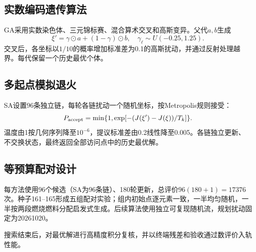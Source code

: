 \subsection{实数编码遗传算法}
GA采用实数染色体、三元锦标赛、混合算术交叉和高斯变异\cite{holland1992}。父代$a,b$生成
\begin{equation}\xi'=\gamma\odot a+(1-\gamma)\odot b,\quad\gamma_\ell\sim U(-0.25,1.25).\end{equation}
交叉后，各坐标以$1/10$的概率增加标准差为0.1的高斯扰动，并通过反射处理越界。每代保留一个历史最优个体。

\subsection{多起点模拟退火}
SA设置96条独立链，每轮各链扰动一个随机坐标，按Metropolis规则接受\cite{kirkpatrick1983}：
\begin{equation}P_{\rm accept}=\min\{1,\exp[-(J(\xi')-J(\xi))/T_k]\}.\end{equation}
温度由1按几何序列降至$10^{-6}$，提议标准差由0.2线性降至0.005。各链独立更新、不交换状态，最终返回全部访问点中的历史最优解。

\subsection{等预算配对设计}
每方法使用96个候选（SA为96条链）、180轮更新，总评价$96(180+1)=17376$次。种子161--165形成五组配对实验；组内初始点逐元素一致，一半均匀随机，一半按两段燃烧燃料分配启发式生成。后续算法使用独立可复现随机流，规划扰动固定为20261020。

搜索结束后，对最优解进行高精度积分复核，并以终端残差和验收通过数评价入轨性能。
